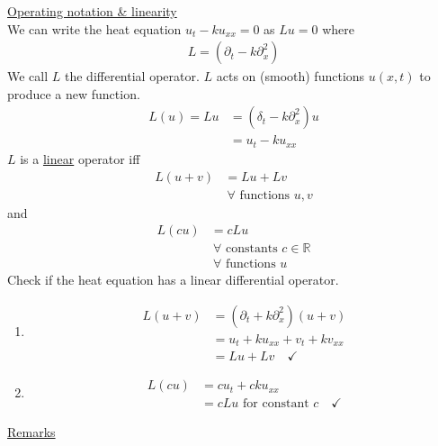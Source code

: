 \documentclass[12pt, letterpaper]{article}
\begin{document}
\underline{Operating notation \& linearity} \\ 
We can write the heat equation $u_t - ku_{xx} = 0$ as $Lu = 0$ where 
\begin{align*}
    L = (\partial_t - k\partial_x^2)
\end{align*}
We call $L$ the differential operator. $L$ acts on (smooth) functions $u(x,t)$ to produce
a new function.
\begin{align*}
    L(u) = Lu &= (\delta_t - k\partial_x^2)u \\
    &= u_t - ku_{xx}
\end{align*}
$L$ is a \underline{linear} operator iff 
\begin{align*}
    L(u+v) &= Lu + Lv \\
    &\ \forall \text{ functions } u,v
\end{align*}
and 
\begin{align*}
    L(cu) &= cLu \\
    &\ \forall \text{ constants } c \in \mathbb{R} \\
    &\ \forall \text{ functions } u
\end{align*}
 Check if the heat equation has a linear differential operator.
\begin{enumerate}
    \item \begin{align*}
        L(u + v) &= (\partial_t + k\partial^2_x)(u+v) \\
        &= u_t + ku_{xx} + v_t + k v_{xx} \\
        &= Lu + Lv \quad \checkmark
    \end{align*}
    \item \begin{align*}
        L(cu) &= cu_t + cku_{xx} \\
        &= cLu \text{ for constant } c \quad \checkmark
    \end{align*}
\end{enumerate}
\underline{Remarks} 
\end{document}
